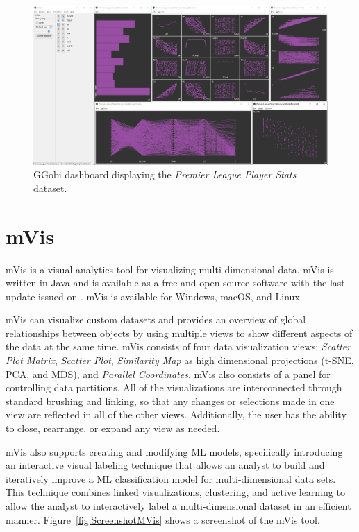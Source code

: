 \begin{figure}[tp]
\centering
\includegraphics[keepaspectratio,width=\linewidth,height=\halfh]
{images/screenshot-ggobi.png}

\caption[GGobi Dashboard]
{%
GGobi dashboard displaying the \emph{Premier League Player Stats} dataset.
}
\label{fig:ScreenshotGGobi}
\end{figure}


\section{mVis}

mVis \parencite{CHEGINI20199} is a visual analytics tool for visualizing
multi-dimensional data. mVis is written in Java and is available as a free
and open-source software with the last update issued on
. mVis is available for Windows, macOS, and
Linux.

mVis can visualize custom datasets and provides an overview of global
relationships between objects by using multiple views to show different
aspects of the data at the same time. mVis consists of four data
visualization views: \emph{Scatter Plot Matrix}, \emph{Scatter Plot},
\emph{Similarity Map} as high dimensional projections (t-SNE, PCA, and
MDS), and \emph{Parallel Coordinates}. mVis also consists of a panel for
controlling data partitions. All of the visualizations are interconnected
through standard brushing and linking, so that any changes or selections
made in one view are reflected in all of the other views. Additionally,
the user has the ability to close, rearrange, or expand any view as
needed.

mVis also supports creating and modifying ML models, specifically
introducing an interactive visual labeling technique that allows an
analyst to build and iteratively improve a ML classification model for
multi-dimensional data sets. This technique combines linked
visualizations, clustering, and active learning to allow the analyst to
interactively label a multi-dimensional dataset in an efficient manner.
Figure~\ref{fig:ScreenshotMVis} shows a screenshot of the mVis tool.




